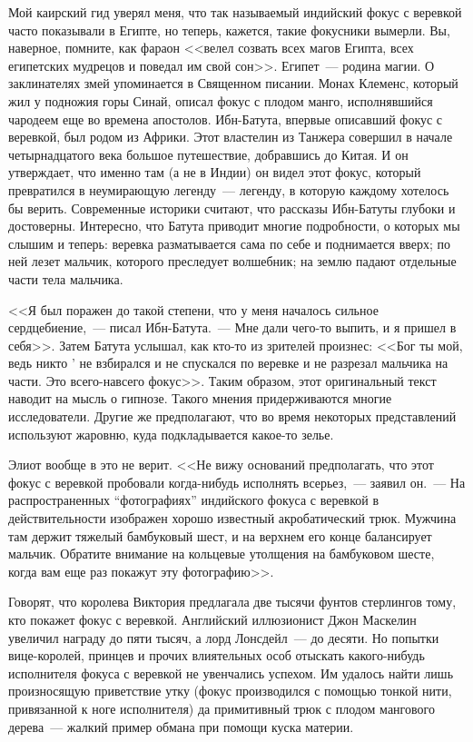 \documentclass[12pt,a4paper,twoside,openany,svgnames]{memoir}
\begin{document}
Мой каирский гид уверял меня, что так называемый индийский фокус с веревкой часто показывали в Египте, но теперь, кажется, такие фокусники вымерли. Вы, наверное, помните, как фараон <<велел созвать всех магов Египта, всех египетских мудрецов и поведал им свой сон>>. Египет~--- родина магии. О заклинателях змей упоминается в Священном писании. Монах Клеменс, который жил у подножия горы Синай, описал фокус с плодом манго, исполнявшийся чародеем еще во времена апостолов. Ибн-Батута, впервые описавший фокус с веревкой, был родом из Африки. Этот властелин из Танжера совершил в начале четырнадцатого века большое путешествие, добравшись до Китая. И он утверждает, что именно там (а не в Индии) он видел этот фокус, который превратился в неумирающую легенду~--- легенду, в которую каждому хотелось бы верить. Современные историки считают, что рассказы Ибн-Батуты глубоки и достоверны. Интересно, что Батута приводит многие подробности, о которых мы слышим и теперь: веревка разматывается сама по себе и поднимается вверх; по ней лезет мальчик, которого преследует волшебник; на землю падают отдельные части тела мальчика.

<<Я был поражен до такой степени, что у меня началось сильное сердцебиение,~--- писал Ибн-Батута.~--- Мне дали чего-то выпить, и я пришел в себя>>. Затем Батута услышал, как кто-то из зрителей произнес: <<Бог ты мой, ведь никто ' не взбирался и не спускался по веревке и не разрезал мальчика на части. Это всего-навсего фокус>>. Таким образом, этот оригинальный текст наводит на мысль о гипнозе. Такого мнения придерживаются многие исследователи. Другие же предполагают, что во время некоторых представлений используют жаровню, куда подкладывается какое-то зелье.

Элиот вообще в это не верит. <<Не вижу оснований предполагать, что этот фокус с веревкой пробовали когда-нибудь исполнять всерьез,~--- заявил он.~--- На распространенных ``фотографиях'' индийского фокуса с веревкой в действительности изображен хорошо известный акробатический трюк. Мужчина там держит тяжелый бамбуковый шест, и на верхнем его конце балансирует мальчик. Обратите внимание на кольцевые утолщения на бамбуковом шесте, когда вам еще раз покажут эту фотографию>>.

Говорят, что королева Виктория предлагала две тысячи фунтов стерлингов тому, кто покажет фокус с веревкой. Английский иллюзионист Джон Маскелин увеличил награду до пяти тысяч, а лорд Лонсдейл~--- до десяти. Но попытки вице-королей, принцев и прочих влиятельных особ отыскать какого-нибудь исполнителя фокуса с веревкой не увенчались успехом. Им удалось найти лишь произносящую приветствие утку (фокус производился с помощью тонкой нити, привязанной к ноге исполнителя) да примитивный трюк с плодом мангового дерева~--- жалкий пример обмана при помощи куска материи.
\end{document}
